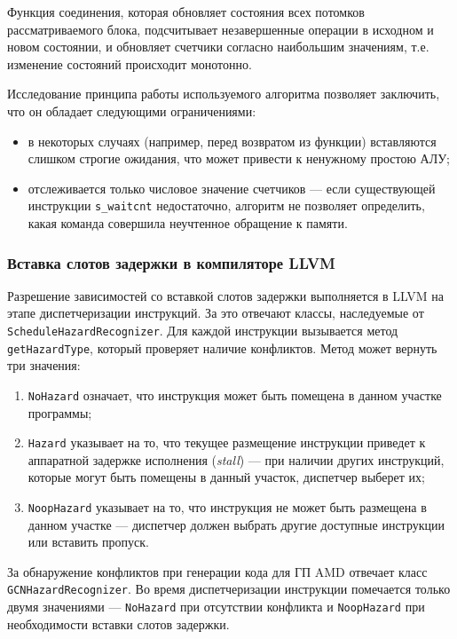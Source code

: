 \documentclass[a4paper,14pt]{extarticle}
\newenvironment{ul}{\begin{itemize}[noitemsep,topsep=0em]}{\end{itemize}\vspace{20pt}}
\newenvironment{ol}{\begin{enumerate}[noitemsep,topsep=0em]}{\end{enumerate}\vspace{20pt}}
\begin{document}
Функция соединения, которая обновляет состояния всех потомков рассматриваемого блока,
подсчитывает незавершенные операции в исходном и новом состоянии, и обновляет
счетчики согласно наибольшим значениям, т.е. изменение состояний происходит монотонно.

Исследование принципа работы используемого алгоритма позволяет заключить, что он обладает
следующими ограничениями:
\begin{ul}
\item в некоторых случаях (например, перед возвратом из функции) вставляются слишком
  строгие ожидания, что может привести к ненужному простою АЛУ;
\item отслеживается только числовое значение счетчиков — если существующей инструкции
  \texttt{s\_waitcnt} недостаточно, алгоритм не позволяет определить, какая команда
  совершила неучтенное обращение к памяти.
\end{ul}

\subsubsection{Вставка слотов задержки в компиляторе LLVM}

Разрешение зависимостей со вставкой слотов задержки выполняется в LLVM на этапе
диспетчеризации инструкций. За это отвечают классы, наследуемые от \texttt{ScheduleHazardRecognizer}.
Для каждой инструкции вызывается метод \texttt{getHazardType}, который проверяет наличие
конфликтов. Метод может вернуть три значения:
\begin{ol}
\item \texttt{NoHazard} означает, что инструкция может быть помещена в данном участке программы;
\item \texttt{Hazard} указывает на то, что текущее размещение инструкции приведет к аппаратной
  задержке исполнения (\textit{stall}) — при наличии других инструкций, которые
  могут быть помещены в данный участок, диспетчер выберет их;
\item \texttt{NoopHazard} указывает на то, что инструкция не может быть размещена в данном
  участке — диспетчер должен выбрать другие доступные инструкции или вставить пропуск.
\end{ol}

За обнаружение конфликтов при генерации кода для ГП AMD отвечает класс \texttt{GCNHazardRecognizer}.
Во время диспетчеризации инструкции помечается только двумя значениями — \texttt{NoHazard} при
отсутствии конфликта и \texttt{NoopHazard} при необходимости вставки слотов задержки.
\end{document}
